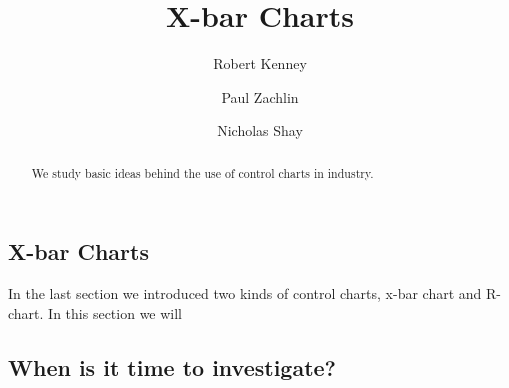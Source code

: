 \documentclass{ximera}
\author{Robert Kenney \and Paul Zachlin \and Nicholas Shay}
\title{X-bar Charts} \license{CC BY-NC-SA 4.0}
\begin{document}
\begin{abstract}
We study basic ideas behind the use of control charts in industry.
\end{abstract}
\maketitle

\begin{onlineOnly}
\section*{X-bar Charts}
\end{onlineOnly}

In the last section we introduced two kinds of control charts, x-bar chart and R-chart.  In this section we will 

\subsection*{When is it time to investigate?}
\end{document}
